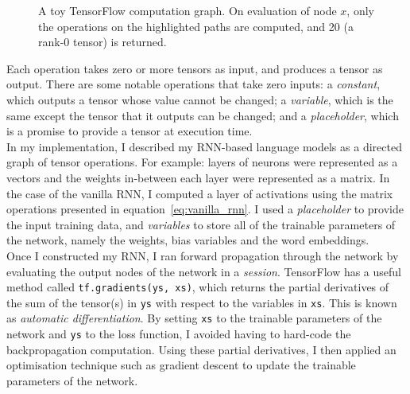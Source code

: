 \documentclass[a4paper, 12pt]{report}
\newcommand{\ttt}[1]{\texttt{#1}}
\newcommand{\tit}[1]{\textit{#1}}
\begin{document}
\begin{figure}[h]
\captionsetup{justification=centering}
\centering
{}
\caption{A toy TensorFlow computation graph. On evaluation of node $x$, only the operations on the highlighted paths are computed, and 20 (a rank-0 tensor) is returned.}
\label{fig:tensorflow}
\end{figure}
Each operation takes zero or more tensors as input, and produces a tensor as output. There are some notable operations that take zero inputs: a \tit{constant}, which outputs a tensor whose value cannot be changed; a \tit{variable}, which is the same except the tensor that it outputs can be changed; and a \tit{placeholder}, which is a promise to provide a tensor at execution time. \\

In my implementation, I described my RNN-based language models as a directed graph of tensor operations. For example: layers of neurons were represented as a vectors and the weights in-between each layer were represented as a matrix. In the case of the vanilla RNN, I computed a layer of activations using the matrix operations presented in equation~\ref{eq:vanilla_rnn}. I used a \tit{placeholder} to provide the input training data, and \tit{variables} to store all of the trainable parameters of the network, namely the weights, bias variables and the word embeddings. \\

Once I constructed my RNN, I ran forward propagation through the network by evaluating the output nodes of the network in a \tit{session}. TensorFlow has a useful method called \ttt{tf.gradients(ys, xs)}, which returns the partial derivatives of the sum of the tensor(s) in \ttt{ys} with respect to the variables in \ttt{xs}. This is known as \tit{automatic differentiation}. By setting \ttt{xs} to the trainable parameters of the network and \ttt{ys} to the loss function, I avoided having to hard-code the backpropagation computation. Using these partial derivatives, I then applied an optimisation technique such as gradient descent to update the trainable parameters of the network. \\
\end{document}
